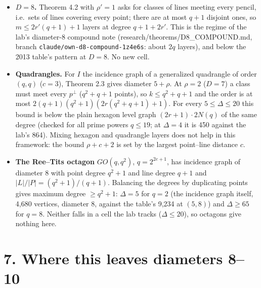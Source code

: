 \documentclass[
  10pt,
]{article}
\providecommand{\tightlist}{%
  \setlength{\itemsep}{0pt}\setlength{\parskip}{0pt}}
\begin{document}
\begin{itemize}
\tightlist
\item
  \textbf{\(D = 8\).} Theorem 4.2 with \(\rho' = 1\) asks for classes of
  lines meeting every pencil, i.e.~sets of lines covering every point;
  there are at most \(q+1\) disjoint ones, so \(m\le 2r'(q+1)+1\) layers
  at degree \(q+1+2r'\). This is the regime of the lab's diameter-8
  compound note (research/theorems/D8\_COMPOUND.md, branch
  \texttt{claude/own-d8-compound-1z4e6s}: about \(2q\) layers), and
  below the 2013 table's pattern at \(D = 8\). No new cell.
\item
  \textbf{Quadrangles.} For \(I\) the incidence graph of a generalized
  quadrangle of order \((q,q)\) (\(c = 3\)), Theorem 2.3 gives diameter
  \(5+\rho\). At \(\rho = 2\) (\(D = 7\)) a class must meet every
  \(p^\perp\) (\(q^2+q+1\) points), so \(k\le q^2+q+1\) and the order is
  at most \(2(q+1)(q^2+1)(2r(q^2+q+1)+1)\). For every
  \(5\le\Delta\le 20\) this bound is below the plain hexagon level graph
  \((2r+1)\cdot 2N(q)\) of the same degree (checked for all prime powers
  \(q\le 19\); at \(\Delta = 4\) it is 450 against the lab's 864).
  Mixing hexagon and quadrangle layers does not help in this framework:
  the bound \(\rho+c+2\) is set by the largest point--line distance
  \(c\).
\item
  \textbf{The Ree--Tits octagon} \(GO(q,q^2)\), \(q = 2^{2e+1}\), has
  incidence graph of diameter 8 with point degree \(q^2+1\) and line
  degree \(q+1\) and \(|L|/|P| = (q^2+1)/(q+1)\). Balancing the degrees
  by duplicating points gives maximum degree \(\ge q^2+1\):
  \(\Delta = 5\) for \(q = 2\) (the incidence graph itself, 4,680
  vertices, diameter 8, against the table's 9,234 at \((5,8)\)) and
  \(\Delta\ge 65\) for \(q = 8\). Neither falls in a cell the lab tracks
  (\(\Delta\le 20\)), so octagons give nothing here.
\end{itemize}

\hypertarget{where-this-leaves-diameters-810}{%
\section{7. Where this leaves diameters
8--10}\label{where-this-leaves-diameters-810}}
\end{document}
